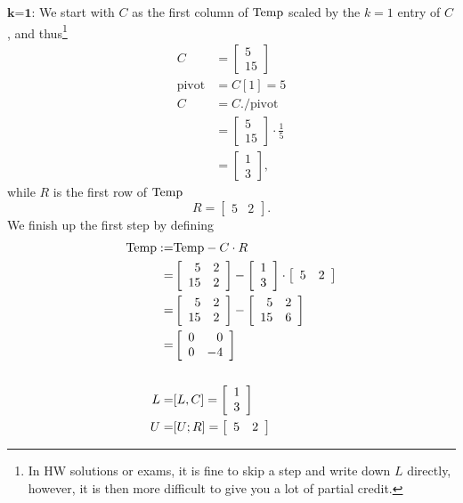 $\textbf{k=1:}$ We start with $C$ as the first column of ${\rm Temp}$ scaled by the $k=1$ entry of $C$, and thus\footnote{In HW solutions or exams, it is fine to skip a step and write down $L$ directly, however, it is then more difficult to give you a lot of partial credit.}
\begin{align*}C &= \left[\begin{array}{r} 5 \\ 15 \end{array} \right]\\
\textrm{pivot}&=C[1] = 5\\
C&=C. \slash \textrm{pivot} \\
&= \left[\begin{array}{r} 5 \\ 15 \end{array} \right] \cdot \frac{1}{5}\\ 
&= \left[\begin{array}{r} 1 \\ 3\end{array} \right], \end{align*}
while $R$ is the first row of  ${\rm Temp}$ 
$$ R = \left[\begin{array}{rr} 5 & 2 \end{array} \right].$$
We finish up the first step by defining
\begin{align*}
    {\rm Temp}:=& {\rm Temp}-C \cdot R \\
    =& \left[\begin{array}{rr} 5 & 2\\
15 & 2 \end{array}\right] -  \left[\begin{array}{r} 1 \\ 3 \end{array} \right] \cdot  \left[\begin{array}{rr} 5 & 2 \end{array} \right] \\
=&  \left[\begin{array}{rr} 5 & 2\\
15 & 2 \end{array}\right] -   \left[\begin{array}{rr} 5 & 2\\
15 & 6 \end{array}\right] \\
=&   \left[\begin{array}{rr} 0 & 0\\
0 & -4\end{array}\right] \\
\\
L=&[L,C] = \left[\begin{array}{r} 1 \\ 3\end{array} \right]\\
U=&[U;R] = \left[\begin{array}{rr} 5 & 2 \end{array} \right]
\end{align*}

